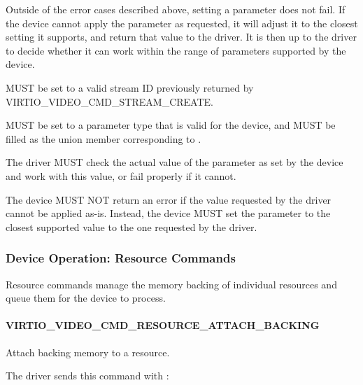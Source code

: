 Outside of the error cases described above, setting a parameter does not
fail. If the device cannot apply the parameter as requested, it will
adjust it to the closest setting it supports, and return that value to
the driver. It is then up to the driver to decide whether it can work
within the range of parameters supported by the device.


 MUST be set to a valid stream ID previously returned
by VIRTIO\_VIDEO\_CMD\_STREAM\_CREATE.

 MUST be set to a parameter type that is valid for the
device, and  MUST be filled as the union member
corresponding to .

The driver MUST check the actual value of the parameter as set by the
device and work with this value, or fail properly if it cannot.


The device MUST NOT return an error if the value requested by the driver
cannot be applied as-is. Instead, the device MUST set the parameter to
the closest supported value to the one requested by the driver.

\subsubsection{Device Operation: Resource Commands}\label{sec:Device Types / Video Device / Device Operation / Device Operation: Resource Commands}

Resource commands manage the memory backing of individual resources and
queue them for the device to process.

\paragraph{VIRTIO_VIDEO_CMD_RESOURCE_ATTACH_BACKING}\label{sec:Device Types / Video Device / Device Operation / Device Operation: Resource Commands / VIRTIO_VIDEO_CMD_RESOURCE_ATTACH_BACKING}

Attach backing memory to a resource.

The driver sends this command with
:

